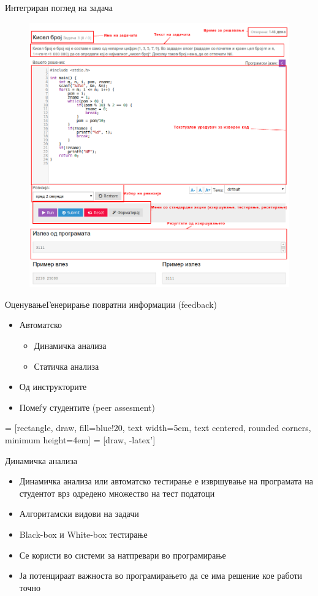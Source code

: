 \begin{frame}{Интегриран поглед на задача}
    \begin{figure}
    \centering
        \includegraphics[width=.6\textwidth]{images/integrated_code_view}
        \label{fig:architecture}
    \end{figure}
\end{frame}
  
\begin{frame}{Оценување}{Генерирање повратни информации (feedback)}
\begin{itemize}
  \item Автоматско
  \begin{itemize}
      \item Динамичка анализа
      \item Статичка анализа
  \end{itemize}
  \item Од инструкторите
  \item Помеѓу студентите (peer assesment)
\end{itemize}
\end{frame}

 = [rectangle, draw, fill=blue!20,
text width=5em, text centered, rounded corners, minimum height=4em]
 = [draw, -latex']

\begin{frame}[fragile]{Динамичка анализа}
    \begin{itemize}
      \item Динамичка анализа или автоматско тестирање е извршување на
      програмата на студентот врз одредено множество на тест податоци
      \item Алгоритамски видови на задачи
      \item Black-box и White-box тестирање
      \item Се користи во системи за натпревари во програмирање
      \item Ја потенцираат важноста во програмирањето да се има решение
      кое работи точно
    \end{itemize}
\end{frame}


